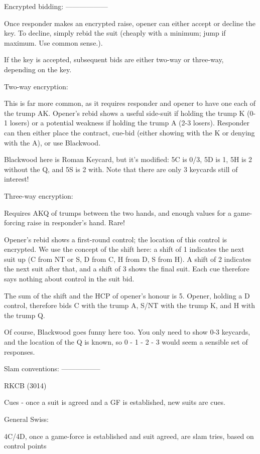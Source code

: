 Encrypted bidding:
------------------

Once responder makes an encrypted raise, opener can either accept or decline
the key.  To decline, simply rebid the suit (cheaply with a minimum; jump if
maximum.  Use common sense.).

If the key is accepted, subsequent bids are either two-way or three-way, depending on the key.

Two-way encryption:

This is far more common, as it requires responder and opener to have one each
of the trump AK.  Opener's rebid shows a useful side-suit if holding the trump
K (0-1 losers) or a potential weakness if holding the trump A (2-3 losers).
Responder can then either place the contract, cue-bid (either showing with the
K or denying with the A), or use Blackwood.

Blackwood here is Roman Keycard, but it's modified: 5C is 0/3, 5D is 1, 5H is 2
without the Q, and 5S is 2 with.  Note that there are only 3 keycards still of
interest!

Three-way encryption:

Requires AKQ of trumps between the two hands, and enough values for a game-forcing raise in responder's hand.  Rare!

Opener's rebid shows a first-round control; the location of this control is
encrypted.  We use the concept of the shift here: a shift of 1 indicates the
next suit up (C from NT or S, D from C, H from D, S from H).  A shift of 2
indicates the next suit after that, and a shift of 3 shows the final suit.
Each cue therefore says nothing about control in the suit bid.

The sum of the shift and the HCP of opener's honour is 5.  Opener, holding a D
control, therefore bids C with the trump A, S/NT with the trump K, and H with
the trump Q.

Of course, Blackwood goes funny here too.  You only need to show 0-3 keycards,
and the location of the Q is known, so 0 - 1 - 2 - 3 would seem a sensible set
of responses.



Slam conventions:
-----------------

RKCB (3014)

Cues - once a suit is agreed and a GF is established, new suits are cues.

General Swiss:

4C/4D, once a game-force is established and suit agreed, are slam tries, based
on control points

